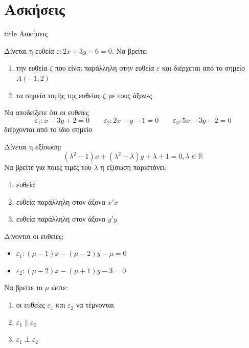 \documentclass{presentation}
\begin{document}
\section{Ασκήσεις}

\begin{frame}[noframenumbering]
  \vfill
  \centering
  \begin{beamercolorbox}[sep=8pt,center,shadow=true,rounded=true]{title}
    Ασκήσεις
  \end{beamercolorbox}
  \vfill
\end{frame}

\begin{askisi} Δίνεται η ευθεία $ε:2x+3y-6=0$. Να βρείτε:
  \begin{enumerate}
    \item<1-> την ευθεία $ζ$ που είναι παράλληλη στην ευθεία $ε$ και διέρχεται από το σημείο $Α(-1,2)$
    \item<2-> τα σημεία τομής της ευθείας $ζ$ με τους άξονες
  \end{enumerate}

\end{askisi}

\begin{askisi} Να αποδείξετε ότι οι ευθείες
  $$ε_1:x-3y+2=0 \qquad ε_2:2x-y-1=0 \qquad ε_3:5x-3y-2=0$$
  διέρχονται από το ίδιο σημείο

\end{askisi}

\begin{askisi} Δίνεται η εξίσωση:
  $$(λ^2-1)x+(λ^2-λ)y+λ+1=0,λ\in\mathbb{R}$$
  Να βρείτε για ποιες τιμές του $λ$ η εξίσωση παριστάνει:
  \begin{enumerate}
    \item<1-> ευθεία
    \item<2-> ευθεία παράλληλη στον άξονα $x'x$
    \item<3-> ευθεία παράλληλη στον άξονα $y'y$
  \end{enumerate}

\end{askisi}

\begin{askisi} Δίνονται οι ευθείες:
  \begin{itemize}
    \item $ε_1:(μ-1)x-(μ-2)y-μ=0$
    \item $ε_2:(μ-2)x-(μ+1)y-3=0$
  \end{itemize}
  Να βρείτε το $μ$ ώστε:
  \begin{enumerate}
    \item<1-> οι ευθείες $ε_1$ και $ε_2$ να τέμνονται
    \item<2-> $ε_1 \parallel ε_2$
    \item<3-> $ε_1 \perp ε_2$
  \end{enumerate}

\end{askisi}
\end{document}
